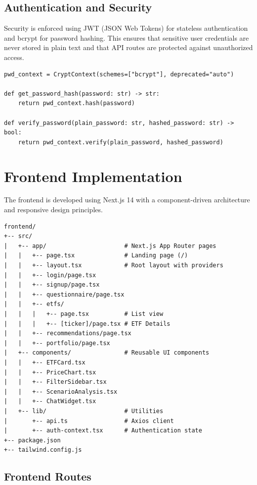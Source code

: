 \subsection{Authentication and Security}

Security is enforced using JWT (JSON Web Tokens) for stateless authentication and bcrypt for password hashing. This ensures that sensitive user credentials are never stored in plain text and that API routes are protected against unauthorized access.

\begin{lstlisting}[style=pythonstyle, caption={Password Hashing and Verification}]
pwd_context = CryptContext(schemes=["bcrypt"], deprecated="auto")

def get_password_hash(password: str) -> str:
    return pwd_context.hash(password)

def verify_password(plain_password: str, hashed_password: str) -> bool:
    return pwd_context.verify(plain_password, hashed_password)
\end{lstlisting}

\section{Frontend Implementation}

The frontend is developed using Next.js 14 with a component-driven architecture and responsive design principles.
\begin{lstlisting}[caption={Frontend Project Structure}]
frontend/
+-- src/
|   +-- app/                      # Next.js App Router pages
|   |   +-- page.tsx              # Landing page (/)
|   |   +-- layout.tsx            # Root layout with providers
|   |   +-- login/page.tsx
|   |   +-- signup/page.tsx
|   |   +-- questionnaire/page.tsx
|   |   +-- etfs/
|   |   |   +-- page.tsx          # List view
|   |   |   +-- [ticker]/page.tsx # ETF Details
|   |   +-- recommendations/page.tsx
|   |   +-- portfolio/page.tsx
|   +-- components/               # Reusable UI components
|   |   +-- ETFCard.tsx
|   |   +-- PriceChart.tsx
|   |   +-- FilterSidebar.tsx
|   |   +-- ScenarioAnalysis.tsx
|   |   +-- ChatWidget.tsx
|   +-- lib/                      # Utilities
|       +-- api.ts                # Axios client
|       +-- auth-context.tsx      # Authentication state
+-- package.json
+-- tailwind.config.js
\end{lstlisting}

\subsection{Frontend Routes}


